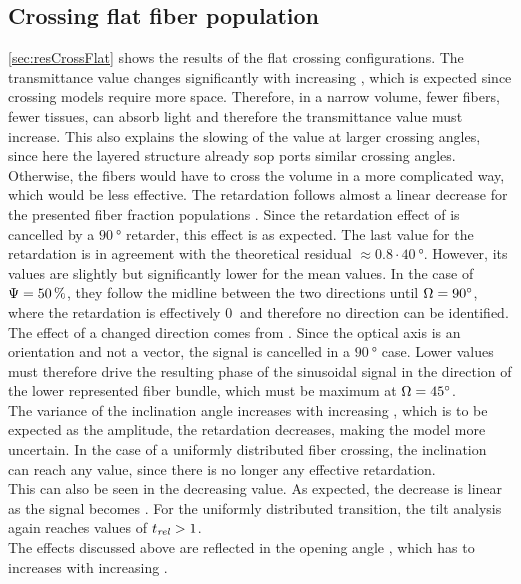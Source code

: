 \subsection{Crossing flat fiber population}
\cref{sec:resCrossFlat} shows the results of the flat crossing configurations.
The transmittance value changes significantly with increasing \modelOmega{}, which is expected since crossing models require more space.
Therefore, in a narrow volume, fewer fibers, \ie{} fewer tissues, can absorb light and therefore the transmittance value must increase.
This also explains the slowing of the value at larger crossing angles, since here the layered structure already sop ports similar crossing angles.
Otherwise, the fibers would have to cross the volume in a more complicated way, which would be less effective.
%
The retardation follows almost a linear decrease for the presented fiber fraction populations \modelPsi{}.
Since the retardation effect of is cancelled by a $\SI{90}{\degree}$ retarder, this effect is as expected.
The last value for the retardation is in agreement with the theoretical residual $\approx 0.8\cdot \SI{40}{\degree}$.
However, its values are slightly but significantly lower for the mean \trel{} values.
In the case of $\textnormal{$\Psi$}{} = \SI{50}{\percent}$, they follow the midline between the two directions until $\textnormal{$\Omega$}=\SI{90}{\degree}$, where the retardation is effectively $\SI{0}{}$ and therefore no direction can be identified.
\\
%
The effect of a changed direction comes from \dummy{}.
Since the optical axis is an orientation and not a vector, the signal is cancelled in a $\SI{90}{\degree}$ case.
Lower values must therefore drive the resulting phase of the sinusoidal signal in the direction of the lower represented fiber bundle, which must be maximum at $\textnormal{$\Omega$}=\SI{45}{\degree}$.
\\
%
The variance of the inclination angle increases with increasing \modelOmega{}, which is to be expected as the amplitude, \ie{} the retardation decreases, making the model more uncertain.
In the case of a uniformly distributed fiber crossing, the inclination can reach any value, since there is no longer any effective retardation.
\\
%
This can also be seen in the decreasing \trel{} value.
As expected, the decrease is linear as the signal becomes \dummy{}.
For the uniformly distributed transition, the tilt analysis again reaches values of $\textnormal{$t_\mathit{rel}$}>1$.
\\
%
The effects discussed above are reflected in the opening angle \modelDOmega{}, which has to increases with increasing \modelOmega{}.
%
%
%
